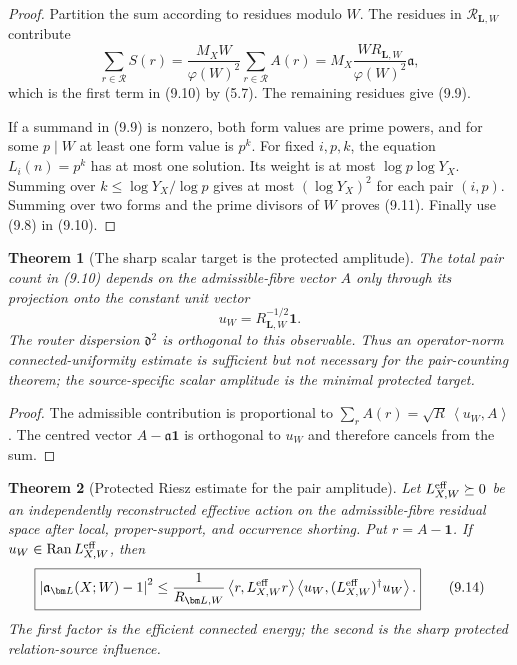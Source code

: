 \documentclass[11pt]{article}
\newtheorem{theorem}{Theorem}[section]
\theoremstyle{definition}
\theoremstyle{remark}
\newcommand{\one}{\mathbf 1}
\newcommand{\Ran}{\operatorname{Ran}}
\newcommand{\abs}[1]{\left\lvert#1\right\rvert}
\newcommand{\ip}[2]{\left\langle#1,#2\right\rangle}
\begin{document}
\begin{proof}
Partition the sum according to residues modulo $W$.  The residues in
$\mathcal R_{\bm L,W}$ contribute
\[
 \sum_{r\in\mathcal R}S(r)
 =\frac{M_X W}{\varphi(W)^2}\sum_{r\in\mathcal R}A(r)
 =M_X\frac{WR_{\bm L,W}}{\varphi(W)^2}\mathfrak a,
\]
which is the first term in \textup{(9.10)} by \textup{(5.7)}.  The remaining
residues give \textup{(9.9)}.

If a summand in \textup{(9.9)} is nonzero, both form values are prime powers,
and for some $p\mid W$ at least one form value is $p^k$.  For fixed $i,p,k$,
the equation $L_i(n)=p^k$ has at most one solution.  Its weight is at most
$\log p\log Y_X$.  Summing over
$k\le\log Y_X/\log p$ gives at most $(\log Y_X)^2$ for each pair $(i,p)$.
Summing over two forms and the prime divisors of $W$ proves \textup{(9.11)}.
Finally use \textup{(9.8)} in \textup{(9.10)}.
\end{proof}

\begin{theorem}[The sharp scalar target is the protected amplitude]
\label{thm:scalar-target}
The total pair count in \textup{(9.10)} depends on the admissible-fibre vector
$A$ only through its projection onto the constant unit vector
\[
 u_W=R_{\bm L,W}^{-1/2}\one.
 \tag{9.13}
\]
The router dispersion $\mathfrak d^2$ is orthogonal to this observable.  Thus
an operator-norm connected-uniformity estimate is sufficient but not necessary
for the pair-counting theorem; the source-specific scalar amplitude is the
minimal protected target.
\end{theorem}

\begin{proof}
The admissible contribution is proportional to
$\sum_rA(r)=\sqrt{R}\,\ip{u_W}{A}$.  The centred vector
$A-\mathfrak a\one$ is orthogonal to $u_W$ and therefore cancels from the sum.
\end{proof}

\begin{theorem}[Protected Riesz estimate for the pair amplitude]
\label{thm:pair-Riesz}
Let $L_{X,W}^{\rm eff}\succeq0$ be an independently reconstructed effective
action on the admissible-fibre residual space after local, proper-support, and
occurrence shorting.  Put $r=A-\one$.  If
$u_W\in\Ran L_{X,W}^{\rm eff}$, then
\[
 \boxed{
 \abs{\mathfrak a_{\bm L}(X;W)-1}^2
 \le\frac1{R_{\bm L,W}}
 \ip{r}{L_{X,W}^{\rm eff}r}
 \ip{u_W}{(L_{X,W}^{\rm eff})^\dagger u_W}.}
 \tag{9.14}
\]
The first factor is the efficient connected energy; the second is the sharp
protected relation-source influence.
\end{theorem}
\end{document}

